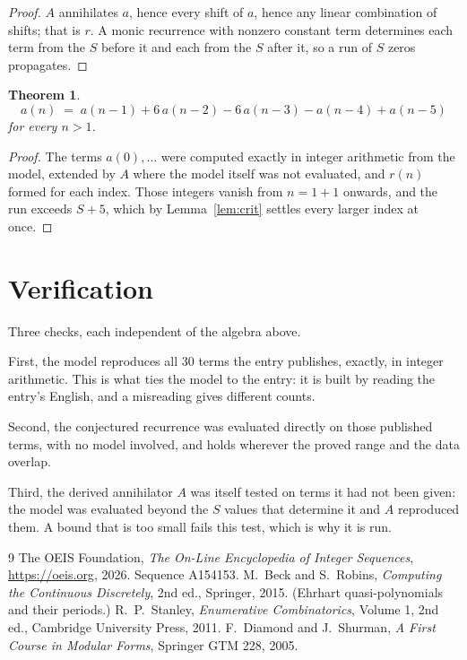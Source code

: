 \documentclass[11pt,a4paper]{article}
\theoremstyle{plain}
\newtheorem{theorem}{Theorem}
\theoremstyle{definition}
\begin{document}
\begin{proof}
$A$ annihilates $a$, hence every shift of $a$, hence any linear combination of shifts; that is
$r$. A monic recurrence with nonzero constant term determines each term from the $S$ before it
and each from the $S$ after it, so a run of $S$ zeros propagates.
\end{proof}

\begin{theorem}
\[
a(n)\;=\;a(n-1) + 6\,a(n-2) - 6\,a(n-3) - a(n-4) + a(n-5)
\]
for every $n>1$.
\end{theorem}

\begin{proof}
The terms $a(0),\dots$ were computed exactly in integer arithmetic from the model, extended by
$A$ where the model itself was not evaluated, and $r(n)$ formed for each index. Those integers
vanish from $n=1+1$ onwards, and the run exceeds $S+5$, which by
Lemma~\ref{lem:crit} settles every larger index at once.
\end{proof}

\section{Verification}

Three checks, each independent of the algebra above.

First, the model reproduces all $30$ terms the entry publishes, exactly, in integer
arithmetic. This is what ties the model to the entry: it is built by reading the entry's
English, and a misreading gives different counts.

Second, the conjectured recurrence was evaluated directly on those published terms, with no
model involved, and holds wherever the proved range and the data overlap.

Third, the derived annihilator $A$ was itself tested on terms it had not been given: the model
was evaluated beyond the $S$ values that determine it and $A$ reproduced them. A bound that is
too small fails this test, which is why it is run.

\begin{thebibliography}{9}
 The OEIS Foundation, \emph{The On-Line Encyclopedia of Integer
Sequences}, \url{https://oeis.org}, 2026. Sequence A154153.
 M.~Beck and S.~Robins, \emph{Computing the Continuous Discretely},
2nd ed., Springer, 2015. (Ehrhart quasi-polynomials and their periods.)
 R.~P.~Stanley, \emph{Enumerative Combinatorics}, Volume 1, 2nd ed.,
Cambridge University Press, 2011.
 F.~Diamond and J.~Shurman, \emph{A First Course in Modular Forms},
Springer GTM 228, 2005.
\end{thebibliography}
\end{document}
